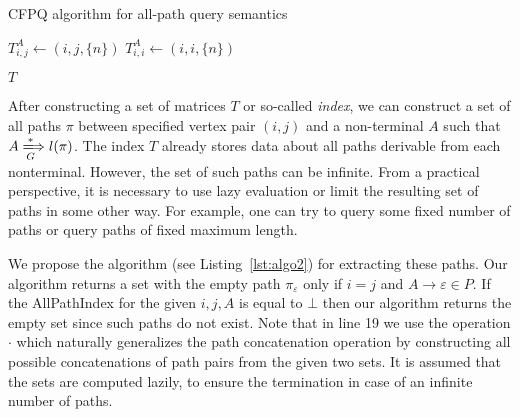 \begin{algorithm}
\small
\begin{algorithmic}[1]
\caption{CFPQ algorithm for all-path query semantics}
\label{lst:algo1}
 \par
{}
{$T^{A}_{i,j} \gets (i,j,\{n\})$}
\EndFor
{}
{$T^{A}_{i,i} \gets (i,i,\{n\})$}
\EndFor

\EndFor
\EndWhile
\State \Return $T$
\EndFunction

\end{algorithmic}
\end{algorithm}

After constructing a set of matrices $T$ or so-called \textit{index}, we can construct a set of all paths $\pi$ between specified vertex pair $(i, j)$ and a non-terminal $A$ such that $A \xLongrightarrow[G]{*} l(\pi)$. The index $T$ already stores data about all paths derivable from each nonterminal. However, the
set of such paths can be infinite. From a practical perspective, it is necessary
to use lazy evaluation or limit the resulting set of paths in some other way.
For example, one can try to query some fixed number of paths or query paths
of fixed maximum length.

We propose the algorithm (see Listing~\ref{lst:algo2}) for extracting these paths. Our algorithm returns a set with the empty path $\pi_{\varepsilon}$ only if $i = j$ and $A \to \varepsilon \in P$. If the AllPathIndex for the given $i,j,A$ is equal to $\bot$ then our algorithm returns the empty set since such paths do not exist. Note that in line 19 we use
the operation $\cdot$ which naturally generalizes the path concatenation operation
by constructing all possible concatenations of path pairs from the given two
sets. It is assumed that the sets are computed lazily, to ensure the termination in case of an infinite number of paths.

